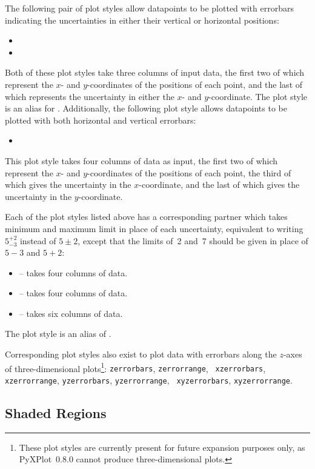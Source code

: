 The following pair of plot styles allow datapoints to be plotted with errorbars
indicating the uncertainties in either their vertical or horizontal positions:
\begin{itemize}
\item {}
\item {}
\end{itemize}
Both of these plot styles take three columns of input data, the first two of
which represent the $x$- and $y$-coordinates of the positions of each point,
and the last of which represents the uncertainty in either the $x$- and
$y$-coordinate.  The plot style  is an alias for
.  Additionally, the following plot style allows datapoints
to be plotted with both horizontal and vertical errorbars:
\begin{itemize}
\item {}
\end{itemize}
This plot style takes four columns of data as input, the first two of which
represent the $x$- and $y$-coordinates of the positions of each point, the
third of which gives the uncertainty in the $x$-coordinate, and the last of
which gives the uncertainty in the $y$-coordinate.

Each of the plot styles listed above has a corresponding partner which takes
minimum and maximum limit in place of each uncertainty, equivalent to writing
$5^{+2}_{-3}$ instead of $5\pm2$, except that the limits of~2 and~7 should be
given in place of $5-3$ and $5+2$:
\begin{itemize}
\item {} -- takes four columns of data.
\item {} -- takes four columns of data.
\item {} -- takes six columns of data.
\end{itemize}
The plot style  is an alias of .

Corresponding plot styles also exist to plot data with errorbars along the
$z$-axes of three-dimensional plots\footnote{These plot styles are currently
present for future expansion purposes only, as PyXPlot~0.8.0 cannot produce
three-dimensional plots.}: {\tt zerrorbars}, {\tt zerrorrange}, {\tt
xzerrorbars}, {\tt xzerrorrange}, {\tt yzerrorbars}, {\tt yzerrorrange}, {\tt
xyzerrorbars}, {\tt xyzerrorrange}.

\subsection{Shaded Regions}

